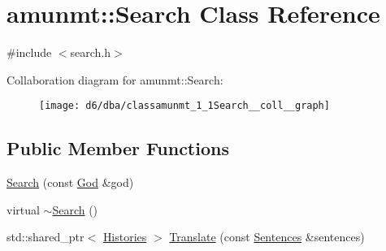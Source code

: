 \hypertarget{classamunmt_1_1Search}{}\section{amunmt\+:\+:Search Class Reference}
\label{classamunmt_1_1Search}


{\ttfamily \#include $<$search.\+h$>$}



Collaboration diagram for amunmt\+:\+:Search\+:
\nopagebreak
\begin{figure}[H]
\begin{center}
\leavevmode
\texttt{[image: d6/dba/classamunmt\_1\_1Search\_\_coll\_\_graph]}
\end{center}
\end{figure}
\subsection*{Public Member Functions}
\begin{DoxyCompactItemize}
\item 
\hyperlink{classamunmt_1_1Search_a53c2b92efabd8d05077a4b8edd7ffba3}{Search} (const \hyperlink{classamunmt_1_1God}{God} \&god)
\item 
virtual \hyperlink{classamunmt_1_1Search_a0e03aa98be68900afc313ff9a8ead751}{$\sim$\+Search} ()
\item 
std\+::shared\+\_\+ptr$<$ \hyperlink{classamunmt_1_1Histories}{Histories} $>$ \hyperlink{classamunmt_1_1Search_a8a55a67dbc9dab24441767d7b2066b9a}{Translate} (const \hyperlink{classamunmt_1_1Sentences}{Sentences} \&sentences)
\end{DoxyCompactItemize}
